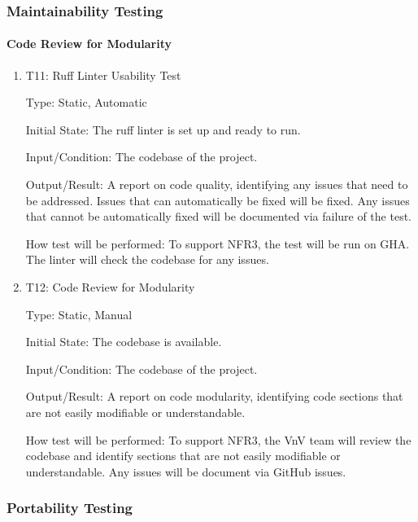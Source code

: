 \documentclass[12pt, titlepage]{article}
\begin{document}
\subsubsection{Maintainability Testing}

\paragraph{Code Review for Modularity}

\begin{enumerate}

\item{T11: Ruff Linter Usability Test\\}

Type: Static, Automatic

Initial State: The ruff linter is set up and ready to run.

Input/Condition: The codebase of the \progname{} project.

Output/Result: A report on code quality, identifying any issues that need to be
addressed. Issues that can automatically be fixed will be fixed. Any issues that
cannot be automatically fixed will be documented via failure of the test.

How test will be performed: To support NFR3, the test will be run on GHA. The
linter will check the codebase for any issues.

\item{T12: Code Review for Modularity\\}

Type: Static, Manual
					
Initial State: The codebase is available.
					
Input/Condition: The codebase of the \progname{} project.
					
Output/Result: A report on code modularity, identifying code sections that are
not easily modifiable or understandable.
					
How test will be performed: To support NFR3, the VnV team will review the
codebase and identify sections that are not easily modifiable or understandable.
Any issues will be document via GitHub issues.

\end{enumerate}

\subsubsection{Portability Testing}
\end{document}
